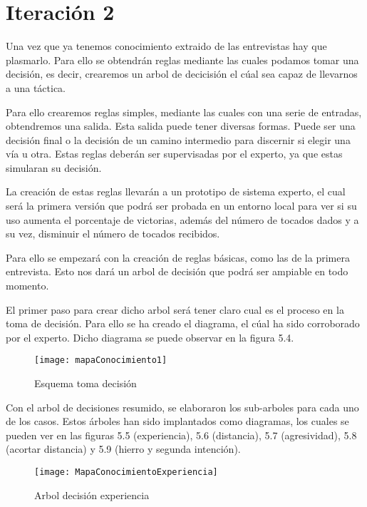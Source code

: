 \section{Iteración 2}

Una vez que ya tenemos conocimiento extraido de las entrevistas hay que plasmarlo.
Para ello se obtendrán reglas mediante las cuales podamos tomar una decisión, es decir,
crearemos un arbol de decicisión el cúal sea capaz de llevarnos a una táctica.

Para ello crearemos reglas simples, mediante las cuales con una serie de entradas,
obtendremos una salida. Esta salida puede tener diversas formas. Puede ser una decisión final
o la decisión de un camino intermedio para discernir si elegir una vía u otra.
Estas reglas deberán ser supervisadas por el experto, ya que estas simularan su decisión.

La creación de estas reglas llevarán a un prototipo de sistema experto, el cual será
la primera versión que podrá ser probada en un entorno local para ver si su uso aumenta
el porcentaje de victorias, además del número de tocados dados y a su vez, disminuir el
número de tocados recibidos.

Para ello se empezará con la creación de reglas básicas, como las de la primera entrevista. Esto
nos dará un arbol de decisión que podrá ser ampiable en todo momento.

El primer paso para crear dicho arbol será tener claro cual es el proceso en la toma de decisión.
Para ello se ha creado el diagrama, el cúal ha sido corroborado por el experto. Dicho diagrama
se puede observar en la figura 5.4.

\begin{figure}[htb]
  \centering
    \texttt{[image: mapaConocimiento1]}
  \caption[Esquema toma decisión]{Esquema toma decisión}
  \label{fig:Esquema toma decisión}
\end{figure}


Con el arbol de decisiones resumido, se elaboraron los sub-arboles para cada uno de los casos.
Estos árboles han sido implantados como diagramas, los cuales se pueden ver en las figuras
5.5 (experiencia), 5.6 (distancia), 5.7 (agresividad), 5.8 (acortar distancia) y
5.9 (hierro y segunda intención).


\begin{figure}[htb]
  \centering
    \texttt{[image: MapaConocimientoExperiencia]}
  \caption[Arbol decisión experiencia]{Arbol decisión experiencia}
  \label{fig:Arbol decisión experiencia}
\end{figure}

